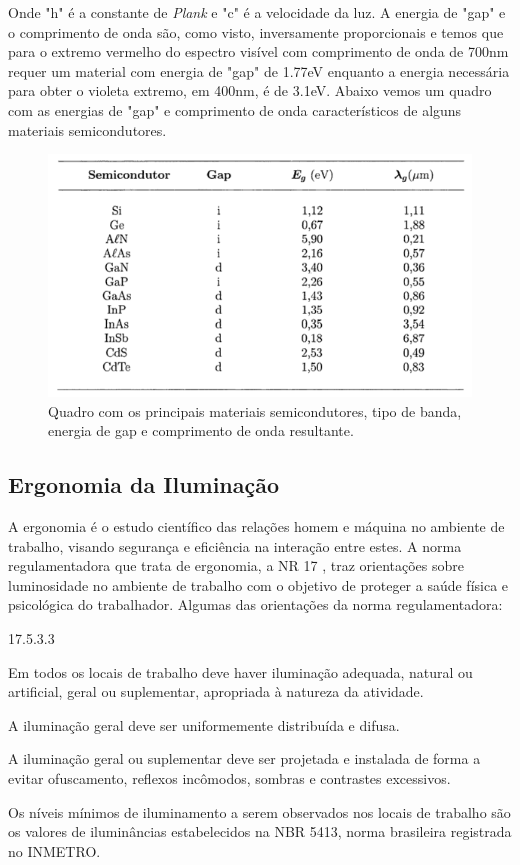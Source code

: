 Onde "h" é a constante de \textit{Plank} e "c" é a velocidade da luz. A energia de "gap" e o comprimento de onda são, como visto, inversamente proporcionais e temos que para o extremo vermelho do espectro visível com comprimento de onda de 700nm requer um material com energia de "gap" de 1.77eV enquanto a energia necessária para obter o violeta extremo, em 400nm, é de 3.1eV. Abaixo vemos um quadro com as energias de "gap" e comprimento de onda característicos de alguns materiais semicondutores.

\begin{figure}[ht]
    \begin{center}
    \includegraphics{figuras/semic.PNG}
    \end{center}
    \caption[Quadro de energias de gap e comprimentos de onda.]{Quadro com os principais materiais semicondutores, tipo de banda, energia de gap e comprimento de onda resultante.}
    \label{semicon}
\end{figure}

\subsection{Ergonomia da Iluminação}

A ergonomia é o estudo científico das relações homem e máquina no ambiente de trabalho, visando segurança e eficiência na interação entre estes. A norma regulamentadora que trata de ergonomia, a NR 17 \cite{norma}, traz orientações sobre luminosidade no ambiente de trabalho com o objetivo de proteger a saúde física e psicológica do trabalhador. Algumas das orientações da norma regulamentadora:

\begin{labeling}{17.5.3.3}
    \item[17.5.3] Em todos os locais de trabalho deve haver iluminação adequada, natural ou artificial, geral ou suplementar, apropriada à natureza da atividade.
    \item[17.5.3.1]  A iluminação geral deve ser uniformemente distribuída e difusa.
    \item[17.5.3.2] A iluminação geral ou suplementar deve ser projetada e instalada de forma a evitar ofuscamento, reflexos incômodos, sombras e contrastes excessivos.
    \item[17.5.3.3] Os níveis mínimos de iluminamento a serem observados nos locais de trabalho são os valores de iluminâncias estabelecidos na NBR 5413, norma brasileira registrada no INMETRO.
\end{labeling}

